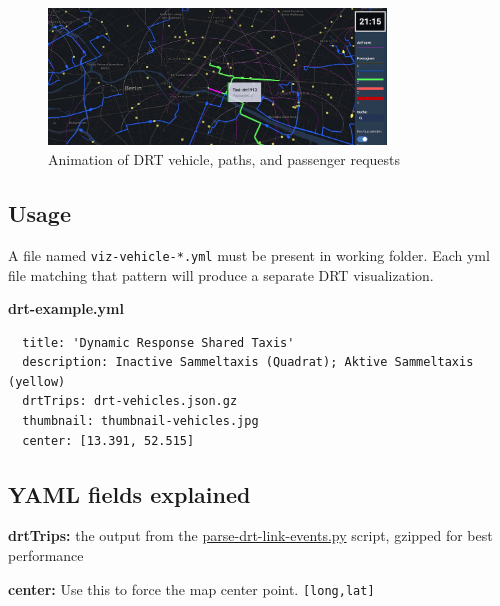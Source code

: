 \begin{figure}[H]
  \centering
  \includegraphics[width=0.8\textwidth]{assets/drt.jpg}
  \caption{Animation of DRT vehicle, paths, and passenger requests}
\end{figure}

\hypertarget{usage}{%
\subsection{Usage}}

A file named \texttt{viz-vehicle-*.yml} must be present in working
folder. Each yml file matching that pattern will produce a separate DRT
visualization.

\textbf{drt-example.yml}

\begin{lstlisting}
  title: 'Dynamic Response Shared Taxis'
  description: Inactive Sammeltaxis (Quadrat); Aktive Sammeltaxis (yellow)
  drtTrips: drt-vehicles.json.gz
  thumbnail: thumbnail-vehicles.jpg
  center: [13.391, 52.515]
\end{lstlisting}

\hypertarget{yaml-fields-explained}{%
\subsection{YAML fields explained}\label{yaml-fields-explained}}

\noindent\textbf{drtTrips:} the output from the
\href{https://github.com/simwrapper/simwrapper/raw/master/scripts/parse-drt-link-events.py}{parse-drt-link-events.py}
script, gzipped for best performance

\noindent\textbf{center:} Use this to force the map center point.
\texttt{{[}long,lat{]}}
